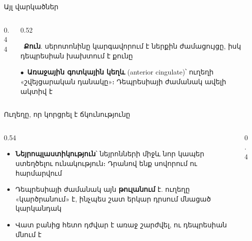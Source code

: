 \begin{frame}{Այլ վարկածներ}
  \begin{columns}[c]
    \begin{column}{0.44\textwidth}
      \centering
      
    \end{column}
    \begin{column}{0.52\textwidth}
      \begin{card}[colback=lavender!35!cardwhite]\ \textbf{Քուն}. սերոտոնինը կարգավորում է ներքին ժամացույցը, իսկ դեպրեսիան խախտում է քունը\end{card}
      \begin{card}[colback=brainpink!25!cardwhite]\textcolor{amRed}{\Large$\bullet$}\ \textbf{Առաջային գոտկային կեղև} (anterior cingulate)՝ ուղեղի «շվեյցարական դանակը»։ Դեպրեսիայի ժամանակ ավելի ակտիվ է\end{card}
    \end{column}
  \end{columns}
\end{frame}

\begin{frame}{Ուղեղը, որ կորցրել է ճկունությունը}
  \begin{columns}[c]
    \begin{column}{0.54\textwidth}
      \begin{itemize}
        \item \textbf{Նեյրոպլաստիկություն}՝ նեյրոնների միջև նոր կապեր ստեղծելու ունակություն։ Դրանով ենք սովորում ու հարմարվում
        \item Դեպրեսիայի ժամանակ այն \textbf{թուլանում} է. ուղեղը «կարծրանում» է, ինչպես շատ երկար դրսում մնացած կարկանդակ 
        \item Վատ բանից հետո դժվար է առաջ շարժվել, ու դեպրեսիան մնում է
      \end{itemize}
    \end{column}
    \begin{column}{0.4\textwidth}
    \end{column}
  \end{columns}
\end{frame}

